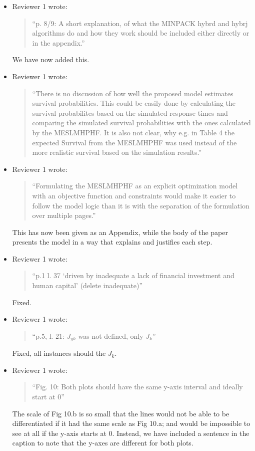 \documentclass{article}
\begin{document}
\begin{itemize}
\item Reviewer 1 wrote:
\begin{quote}
``p. 8/9: A short explanation, of what the MINPACK hybrd and hybrj algorithms do and how they work should be included either directly or in the appendix.''
\end{quote}
We have now added this.

\item Reviewer 1 wrote:
\begin{quote}
``There is no discussion of how well the proposed model estimates survival probabilities. This could be easily done by calculating the survival probabilites based on the simulated response times and comparing the simulated survival probabilities with the ones calculated by the MESLMHPHF. It is also not clear, why e.g. in Table 4 the expected Survival from the MESLMHPHF was used instead of the more realistic survival based on the simulation results.''
\end{quote}

\item Reviewer 1 wrote:
\begin{quote}
``Formulating the MESLMHPHF as an explicit optimization model with an objective function and constraints would make it easier to follow the model logic than it is with the separation of the formulation over multiple pages.''
\end{quote}
This has now been given as an Appendix, while the body of the paper presents the model in a way that explains and justifies each step.

\item Reviewer 1 wrote:
\begin{quote}
``p.1 l. 37 ‘driven by inadequate a lack of financial investment and human capital’ (delete inadequate)''
\end{quote}
Fixed.

\item Reviewer 1 wrote:
\begin{quote}
``p.5, l. 21: $J_{yk}$ was not defined, only $J_k$''
\end{quote}
Fixed, all instances should the $J_k$.

\item Reviewer 1 wrote:
\begin{quote}
``Fig. 10: Both plots should have the same y-axis interval and ideally start
at 0''
\end{quote}
The scale of Fig 10.b is so small that the lines would not be able to be differentiated if it had the same scale as Fig 10.a; and would be impossible to see at all if the y-axis starts at 0. Instead, we have included a sentence in the caption to note that the y-axes are different for both plots.


\end{itemize}
\end{document}
